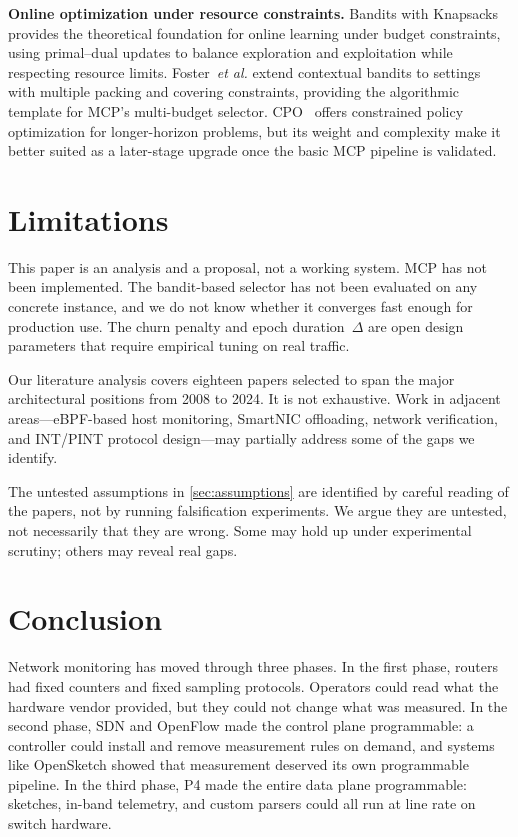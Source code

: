 \documentclass[letterpaper,twocolumn,10pt]{article}
\newcommand{\system}{MCP\xspace}
\newcommand{\etal}{\textit{et al.}\xspace}
\newcommand{\para}[1]{\smallskip\noindent\textbf{#1.}}
\begin{document}
\para{Online optimization under resource constraints}
Bandits with Knapsacks~\cite{badanidiyuru2018bwk} provides the
theoretical foundation for online learning under budget
constraints, using primal--dual updates to balance exploration
and exploitation while respecting resource limits.
Foster~\etal\cite{foster2023contextual} extend contextual bandits
to settings with multiple packing and covering constraints,
providing the algorithmic template for \system's multi-budget
selector.
CPO~\cite{achiam2017cpo} offers constrained policy optimization
for longer-horizon problems, but its weight and complexity make
it better suited as a later-stage upgrade once the basic \system
pipeline is validated.

\section{Limitations}
\label{sec:limitations}

This paper is an analysis and a proposal, not a working system.
\system has not been implemented. The bandit-based selector has
not been evaluated on any concrete instance, and we do not know
whether it converges fast enough for production use. The churn
penalty and epoch duration~$\Delta$ are open design parameters
that require empirical tuning on real traffic.

Our literature analysis covers eighteen papers selected to span
the major architectural positions from 2008 to 2024. It is not
exhaustive. Work in adjacent areas---eBPF-based host monitoring,
SmartNIC offloading, network verification, and INT/PINT protocol
design---may partially address some of the gaps we identify.

The untested assumptions in \cref{sec:assumptions} are identified
by careful reading of the papers, not by running falsification
experiments. We argue they are untested, not necessarily that they
are wrong. Some may hold up under experimental scrutiny; others
may reveal real gaps.

\section{Conclusion}
\label{sec:conclusion}

Network monitoring has moved through three phases. In the first
phase, routers had fixed counters and fixed sampling protocols.
Operators could read what the hardware vendor provided, but they
could not change what was measured. In the second phase, SDN and
OpenFlow made the control plane programmable: a controller could
install and remove measurement rules on demand, and systems like
OpenSketch showed that measurement deserved its own programmable
pipeline. In the third phase, P4 made the entire data plane
programmable: sketches, in-band telemetry, and custom parsers
could all run at line rate on switch hardware.
\end{document}
